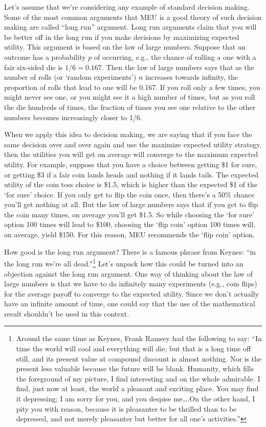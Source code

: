 \documentclass[]{tufte-book}
\begin{document}
Let's assume that we're considering any example of standard decision making. Some of the most common arguments that MEU is a good theory of such decision making are called ``long run'' argument. Long run arguments claim that you will be better off in the long run if you make decisions by maximizing expected utility. This argument is based on the law of large numbers. Suppose that an outcome has a probability \(p\) of occurring, e.g., the chance of rolling a one with a fair six-sided die is \(1/6=0.167\). Then the law of large numbers says that as the number of rolls (or `random experiments') \(n\) increases towards infinity, the proportion of rolls that lead to one will be 0.167. If you roll only a few times, you might never see one, or you might see it a high number of times, but as you roll the die hundreds of times, the fraction of times you see one relative to the other numbers becomes increasingly closer to 1/6.

When we apply this idea to decision making, we are saying that if you face the same decision over and over again and use the maximize expected utility strategy, then the utilities you will get on average will converge to the maximum expected utility. For example, suppose that you have a choice between getting \$1 for sure, or getting \$3 if a fair coin lands heads and nothing if it lands tails. The expected utility of the coin toss choice is \$1.5, which is higher than the expected \$1 of the `for sure' choice. If you only get to flip the coin once, then there's a 50\% chance you'll get nothing at all. But the law of large numbers says that if you get to flip the coin many times, on average you'll get \$1.5. So while choosing the `for sure' option 100 times will lead to \$100, choosing the `flip coin' option 100 times will, on average, yield \$150. For this reason, MEU recommends the `flip coin' option.

How good is the long run argument? There is a famous phrase from Keynes: ``in the long run we're all dead.''\footnote{Around the same time as Keynes, Frank Ramsey had the following to say: ``In time the world will cool and everything will die; but that is a long time off still, and its present value at compound discount is almost nothing. Nor is the present less valuable because the future will be blank. Humanity, which fills the foreground of my picture, I find interesting and on the whole admirable. I find, just now at least, the world a pleasant and exciting place. You may find it depressing; I am sorry for you, and you despise me\ldots{}.On the other hand, I pity you with reason, because it is pleasanter to be thrilled than to be depressed, and not merely pleasanter but better for all one's activities.''} Let's unpack how this could be turned into an objection against the long run argument. One way of thinking about the law of large numbers is that we have to do infinitely many experiments (e.g., coin flips) for the average payoff to converge to the expected utility. Since we don't actually have an infinite amount of time, one could say that the use of the mathematical result shouldn't be used in this context.
\end{document}
